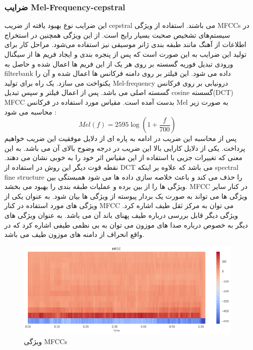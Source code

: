 \documentclass[conference]{IEEEtran}
\begin{document}
\subsubsection{ ضرایب Mel-Frequency-cepstral }
این ضرایب نوع بهبود یافته از ضریب cepstral می باشند. استفاده از ویژگی MFCCs  در سیستم‌های تشخیص صحبت  بسیار رایج است. از این ویژگی همچنین در استخراج اطلاعات از آهنگ  مانند طبقه بندی ژانر موسیقی نیز استفاده می‌شود.
مراحل کار برای تولید این ضرایب به این صورت است که پس از پنجره بندی و ایجاد فریم ها از سیگنال ورودی تبدیل فوریه گسسته بر روی هر یک از این فریم ها اعمال شده و حاصل به filterbank داده می شود. این فیلتر بر روی دامنه فرکانس ها اعمال شده و آن را یکنواخت می سازد. یک راه برای تولید Mel-frequency درونیابی بر روی فرکانس گسسته اصلی می باشد. پس از اعمال فیلتر و سپس تبدیل cosine گسسته(DCT) MFCC بدست آمده است.
مقیاس مورد استفاده در فرکانس Mel به صورت زیر محاسبه می شود :
\begin{equation}
    Mel(f)=2595 \log (1+\frac{f}{700})
\end{equation}
پس از محاسبه این ضریب در ادامه به پاره ای از دلایل موفقیت این ضریب خواهیم پرداخت. یکی از دلایل کارایی بالا این ضریب در درجه وضوح بالای آن می باشد. به این معنی که تغییرات جزیی با استفاده از این مقیاس اثر خود را به خوبی نشان می دهند. نقطه قوت دیگر این روش در استفاده از DCT می باشد که علاوه بر اینکه spectral fine structure را حذف می کند و باعث خلاصه سازی داده ها می شود همبستگی بین ویژگی ها را از بین برده و عملیات طبقه بندی را بهبود می بخشد.
MFCC   در کنار سایر ویژگی ها می تواند به صورت یک بردار پیوسته از ویژگی ها بیان شود. به عنوان یکی از ویژگی های مورد استفاده در کنار MFCC می توان به مرکز ثقل طیف اشاره کرد. ویژگی دیگر قابل بررسی درباره طیف پهنای باند آن می باشد. به عنوان ویژگی های دیگر به خصوص درباره صدا های موزون می توان به بی نظمی طیفی اشاره کرد که در واقع انحراف از دامنه های موزون طیف می باشد. 
    \begin{figure}[h!]
\includegraphics[width=\linewidth]{3.png}
      \caption{  ویژگی MFCCs }
      \label{fig:fig 1}
    \end{figure}
\end{document}
